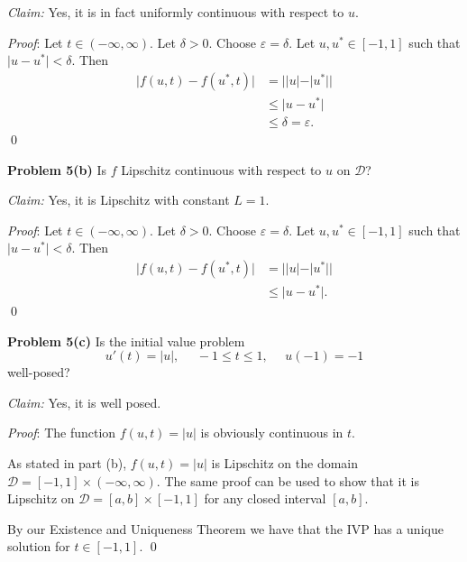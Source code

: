 \documentclass[12pt]{article}
\newcommand{\problem}[1]{\hspace{-4 ex} \large \textbf{Problem #1} }
\renewenvironment{proof}{\hspace{-4 ex} \emph{Proof}:}{\qed}
\begin{document}
\textit{Claim:} Yes, it is in fact uniformly continuous with respect to $u$. \bigbreak

\begin{proof}
	Let $t \in (-\infty, \infty)$. Let $\delta >0$. Choose $\varepsilon = \delta$. Let $u, u^* \in [-1, 1]$ such that $\vert u - u^* \vert < \delta$. Then 
	\begin{align*}
		\vert f(u, t) - f(u^*,t) \vert &= \big \vert \vert u \vert - \vert u^* \vert \big \vert  \\
		& \leq \vert u - u^* \vert \tag{reverse triangle inequality} \\
		& \leq \delta = \varepsilon.
	\end{align*}
\end{proof}

\bigbreak
\problem{5(b)} Is $f$ Lipschitz continuous with respect to $u$ on $\mathcal{D}$? \bigbreak

\textit{Claim:} Yes, it is Lipschitz with constant $L = 1$. \bigbreak

\begin{proof}
	Let $t \in (-\infty, \infty)$. Let $\delta >0$. Choose $\varepsilon = \delta$. Let $u, u^* \in [-1, 1]$ such that $\vert u - u^* \vert < \delta$. Then 
	\begin{align*}
		\vert f(u, t) - f(u^*,t) \vert &= \big \vert \vert u \vert - \vert u^* \vert \big \vert  \\
		& \leq \vert u - u^* \vert. \tag{reverse triangle inequality}
	\end{align*}
\end{proof}

\bigbreak
\problem{5(c)} Is the initial value problem 
$$
u'(t) = \vert u \vert, \phantom{=} -1 \leq t \leq 1, \phantom{=}u(-1)=-1
$$
well-posed? \bigbreak

\textit{Claim:} Yes, it is well posed. \bigbreak

\begin{proof}
	The function $f(u,t) = \vert u \vert$ is obviously continuous in $t$. \bigbreak
	
	As stated in part (b), $f(u,t) = \vert u \vert$ is Lipschitz on the domain $\mathcal{D}=[-1,1] \times (-\infty, \infty)$. The same proof can be used to show that it is Lipschitz on $\mathcal{D}=[a,b] \times [-1,1]$ for any closed interval $[a,b]$. \bigbreak
	
	By our Existence and Uniqueness Theorem we have that the IVP has a unique solution for $t \in [-1, 1]$.
\end{proof}
\end{document}
